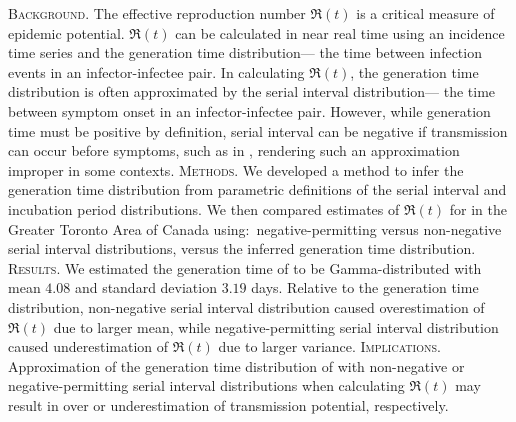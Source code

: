\textsc{Background}.
The effective reproduction number $\Re(t)$
is a critical measure of epidemic potential.
$\Re(t)$ can be calculated in near real time
using an incidence time series and the generation time distribution---%
the time between infection events in an infector-infectee pair.
In calculating $\Re(t)$, the generation time distribution
is often approximated by the serial interval distribution---%
the time between symptom onset in an infector-infectee pair.
However, while generation time must be positive by definition,
serial interval can be negative if transmission can occur before symptoms,
such as in \covid, rendering such an approximation improper in some contexts.
\textsc{Methods}.
We developed a method to infer the generation time distribution
from parametric definitions of
the serial interval and incubation period distributions.
We then compared estimates of $\Re(t)$ for \covid in
the Greater Toronto Area of Canada using:\
negative-permitting versus non-negative serial interval distributions,
versus the inferred generation time distribution.
\textsc{Results}.
We estimated the generation time of \covid to be
Gamma-distributed with mean $4.08$ and standard deviation $3.19$ days.
Relative to the generation time distribution,
non-negative serial interval distribution caused overestimation of $\Re(t)$
due to larger mean, while
negative-permitting serial interval distribution caused underestimation of $\Re(t)$
due to larger variance.
\textsc{Implications}.
Approximation of the generation time distribution of \covid
with non-negative or negative-permitting serial interval distributions
when calculating $\Re(t)$ may result in over or underestimation of
transmission potential, respectively.